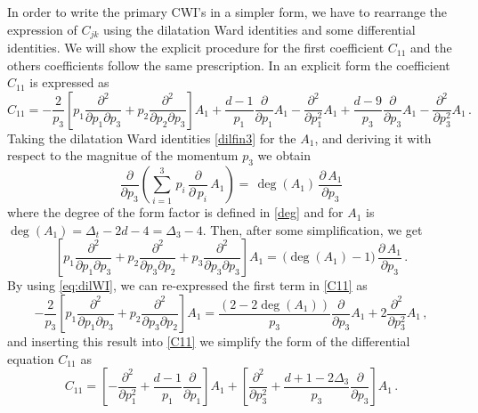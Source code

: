 \documentclass[a4paper,11pt,openright,twoside]{book}
\numberwithin{equation}{section}
\begin{document}
{{{	In order to write the primary CWI's in a simpler form, we have to rearrange the expression of $C_{jk}$ using the dilatation Ward identities and some differential identities. We will show the explicit procedure for the first coefficient $C_{11}$ and the others coefficients follow the same prescription. In an explicit form the coefficient $C_{11}$ is expressed as
	\begin{equation}
		C_{11}= - \frac{2}{p_3} \left[ p_1 \frac{\partial^2}{\partial p_1 \partial p_3 } + p_2 \frac{\partial^2}{\partial p_2 \partial p_3 } \right] A_1 + \frac{d-1}{p_1} \frac{\partial}{\partial p_1} A_1 - \frac{\partial^2}{\partial p_1^2} A_1 + \frac{d-9}{p_3} \frac{\partial}{\partial p_3} A_1 - \frac{\partial^2}{\partial p_3^2} A_1\,.\label{C11}
	\end{equation}
	{
		Taking the dilatation Ward identities \eqref{dilfin3} for the $A_1$, and deriving it with respect to the magnitue of the momentum $p_3$ we obtain
		\begin{equation}
			\frac{\partial}{\partial p_3}\left(\sum_{i=1}^3\,p_i\,\frac{\partial}{\partial\,p_i}\, A_1\right) =\,\deg(A_1)\,\frac{\partial\,A_1}{\partial p_3}
		\end{equation}
		where the degree of the form factor is defined in \eqref{deg} and for $A_1$ is $\deg(A_1)=\Delta_t-2d-4=\Delta_3-4$. Then, after some simplification, we get
		\begin{equation}
			\left[  p_1 \frac{\partial^2}{\partial p_1 \partial p_3} +  p_2 \frac{\partial^2}{\partial p_3 \partial p_2}  +  p_3 \frac{\partial^2}{\partial p_3 \partial p_3} \right] A_1 =\,\bigg(\deg(A_1)-1\bigg)\,\frac{\partial\,A_1}{\partial p_3}\,.
			\label{eq:dilWI}
		\end{equation}
	}%
	By using \eqref{eq:dilWI}, we can re-expressed the first term in \eqref{C11} as
	\begin{equation}
		-\frac{2}{p_3}  \left[ p_1 \frac{\partial^2}{\partial p_1 \partial p_3} +  p_2 \frac{\partial^2}{\partial p_3 \partial p_2}  \right]  A_1 = \frac{\left( 2 - 2 \deg(A_1) \right)}{p_3} \frac{\partial}{\partial p_3} A_1 +2  \frac{\partial^2}{\partial p_3^2} A_1\,,
	\end{equation}
	and inserting this result into \eqref{C11} we simplify the form of the differential equation $C_{11}$ as
	\begin{equation}
		C_{11}= \left[ -\frac{\partial^2}{\partial p_1^2} + \frac{d-1}{p_1} \frac{\partial}{\partial p_1} \right] A_1 + \left[ \frac{\partial^2 }{\partial p_3^2}  + \frac{d+1-2\Delta_3}{p_3} \frac{\partial}{\partial p_3} \right] A_1 \,.  

\end{equation}}}}
\end{document}
